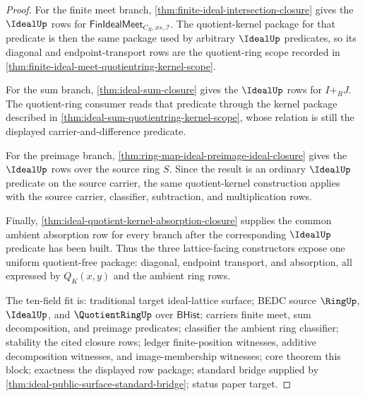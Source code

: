 \begin{proof}
For the finite meet branch, \autoref{thm:finite-ideal-intersection-closure} gives the $\IdealUp$ rows for $\mathsf{FinIdealMeet}_{C_R,xs,\mathcal{I}}$. The quotient-kernel package for that predicate is then the same package used by arbitrary $\IdealUp$ predicates, so its diagonal and endpoint-transport rows are the quotient-ring scope recorded in \autoref{thm:finite-ideal-meet-quotientring-kernel-scope}.

For the sum branch, \autoref{thm:ideal-sum-closure} gives the $\IdealUp$ rows for $I+_RJ$. The quotient-ring consumer reads that predicate through the kernel package described in \autoref{thm:ideal-sum-quotientring-kernel-scope}, whose relation is still the displayed carrier-and-difference predicate.

For the preimage branch, \autoref{thm:ring-map-ideal-preimage-ideal-closure} gives the $\IdealUp$ rows over the source ring $S$. Since the result is an ordinary $\IdealUp$ predicate on the source carrier, the same quotient-kernel construction applies with the source carrier, classifier, subtraction, and multiplication rows.

Finally, \autoref{thm:ideal-quotient-kernel-absorption-closure} supplies the common ambient absorption row for every branch after the corresponding $\IdealUp$ predicate has been built. Thus the three lattice-facing constructors expose one uniform quotient-free package: diagonal, endpoint transport, and absorption, all expressed by $Q_K(x,y)$ and the ambient ring rows.

The ten-field fit is: traditional target ideal-lattice surface; BEDC source $\RingUp$, $\IdealUp$, and $\QuotientRingUp$ over $\mathsf{BHist}$; carriers finite meet, sum decomposition, and preimage predicates; classifier the ambient ring classifier; stability the cited closure rows; ledger finite-position witnesses, additive decomposition witnesses, and image-membership witnesses; core theorem this block; exactness the displayed row package; standard bridge supplied by \autoref{thm:ideal-public-surface-standard-bridge}; status paper target.
\end{proof}
